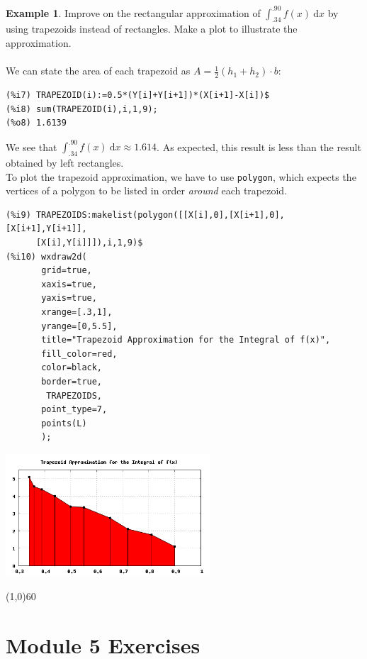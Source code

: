 \documentclass[10.5pt,twoside]{report}
\theoremstyle{definition}
\newtheorem{exmp}{Example}[section]
\begin{document}
\begin{exmp} Improve on the rectangular approximation of $\displaystyle \int_{.34}^{.90} f(x) \ \mathrm{d}x$ by using trapezoids instead of rectangles.  Make a plot to illustrate the approximation.\\
${}$\\

We can state the area of each trapezoid as $A=\frac{1}{2}(h_1+h_2)\cdot b$:

\begin{verbatim}
(%i7) TRAPEZOID(i):=0.5*(Y[i]+Y[i+1])*(X[i+1]-X[i])$
(%i8) sum(TRAPEZOID(i),i,1,9);
(%o8) 1.6139
\end{verbatim}

We see that $\int_{.34}^{.90} f(x) \ \mathrm{d}x \approx 1.614$.  As expected, this result is less than the result obtained by left rectangles.\\

To plot the trapezoid approximation, we have to use \verb|polygon|, which expects the vertices of a polygon to be listed in order \textit{around} each trapezoid.

\begin{verbatim}
(%i9) TRAPEZOIDS:makelist(polygon([[X[i],0],[X[i+1],0],[X[i+1],Y[i+1]],
      [X[i],Y[i]]]),i,1,9)$
(%i10) wxdraw2d(
       grid=true,
       xaxis=true,
       yaxis=true,
       xrange=[.3,1],
       yrange=[0,5.5],
       title="Trapezoid Approximation for the Integral of f(x)",
       fill_color=red,
       color=black,
       border=true,
        TRAPEZOIDS,
       point_type=7,
       points(L)
       );
\end{verbatim}

\includegraphics[width=3in]{example_6_4_2_1}

\end{exmp}


\line(1,0){60}
\linethickness{0.5mm}

\pagebreak

\section{Module 5 Exercises}\label{Module 5 Exercises}
\end{document}
